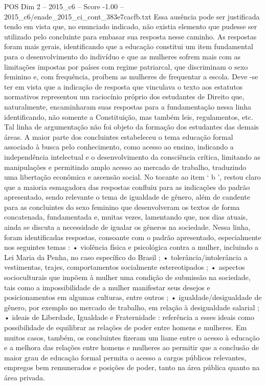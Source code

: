 \begin{textsample}{POS Dim 2 – 2015\_c6 – Score -1.00 – 2015\_c6/enade\_2015\_ci\_cont\_383e7cacfb.txt}
Essa ausência pode ser justificada tendo em vista que, no enunciado indicado, não existia elemento que pudesse ser utilizado pelo concluinte para embasar sua resposta nesse caminho.
As respostas foram mais gerais, identificando que a educação constitui um item fundamental para o desenvolvimento do indivíduo e que as mulheres sofrem mais com as limitações impostas por países com regime patriarcal, que discriminam o sexo feminino e, com frequência, proíbem as mulheres de frequentar a escola.
Deve -se ter em vista que a indicação de resposta que vinculava o texto aos estatutos normativos representou um raciocínio próprio dos estudantes de Direito que, naturalmente, encaminharam suas respostas para a fundamentação nessa linha identificando, não somente a Constituição, mas também leis, regulamentos, etc.
Tal linha de argumentação não foi objeto da formação dos estudantes das demais áreas.
A maior parte dos concluintes estabeleceu o tema educação formal associado à busca pelo conhecimento, como acesso ao ensino, indicando a independência intelectual e o desenvolvimento da consciência crítica, limitando as manipulações e permitindo amplo acesso ao mercado de trabalho, traduzindo uma libertação econômica e ascensão social.
No tocante ao item ‘ b ’, restou claro que a maioria esmagadora das respostas confluiu para as indicações do padrão apresentado, sendo relevante o tema de igualdade de gênero, além de candente para as concluintes do sexo feminino que desenvolveram os textos de forma concatenada, fundamentada e, muitas vezes, lamentando que, nos dias atuais, ainda se discuta a necessidade de igualar os gêneros na sociedade.
Nessa linha, foram identificadas respostas, consoante com o padrão apresentado, especialmente nos seguintes temas : • violência física e psicológica contra a mulher, incluindo a Lei Maria da Penha, no caso específico do Brasil ; • tolerância/intolerância a vestimentas, trajes, comportamentos socialmente estereotipados ; • aspectos socioculturais que impõem à mulher uma condição de submissão na sociedade, tais como a impossibilidade de a mulher manifestar seus desejos e posicionamentos em algumas culturas, entre outros ; • igualdade/desigualdade de gênero, por exemplo no mercado de trabalho, em relação à desigualdade salarial ; • ideais de Liberdade, Igualdade e Fraternidade : referência a esses ideais como possibilidade de equilibrar as relações de poder entre homens e mulheres.
Em muitos casos, também, os concluintes fizeram um liame entre o acesso à educação e a melhora das relações entre homens e mulheres ao permitir que a conclusão de maior grau de educação formal permita o acesso a cargos públicos relevantes, empregos bem remunerados e posições de poder, tanto na área pública quanto na área privada.

\end{textsample}
